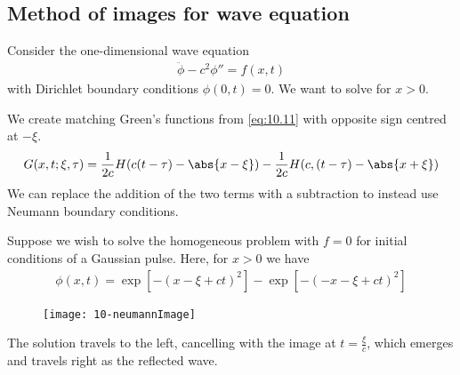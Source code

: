 \subsection{Method of images for wave equation}
Consider the one-dimensional wave equation
\begin{align*}
	\ddot \phi - c^2 \phi'' = f(x,t)
\end{align*}
with Dirichlet boundary conditions $\phi(0,t) = 0$.
We want to solve for $x > 0$.

We create matching Green's functions from \cref{eq:10.11} with opposite sign centred at $-\xi$.
\begin{align*}
	G(x,t;\xi,\tau) = \frac{1}{2c} H(c(t-\tau) - \abs{x-\xi}) - \frac{1}{2c} H(c,(t-\tau) - \abs{x+\xi})
\end{align*}
We can replace the addition of the two terms with a subtraction to instead use Neumann boundary conditions.

Suppose we wish to solve the homogeneous problem with $f = 0$ for initial conditions of a Gaussian pulse.
Here, for $x > 0$ we have
\begin{align} \label{eq:10.25}
	\phi(x,t) = \exp[-(x-\xi + ct)^2] - \exp[-(-x - \xi + ct)^2]
\end{align}
\begin{figure}[h]
    \centering 
    \texttt{[image: 10-neumannImage]} 
\end{figure}
The solution travels to the left, cancelling with the image at $t = \frac{\xi}{c}$, which emerges and travels right as the reflected wave.